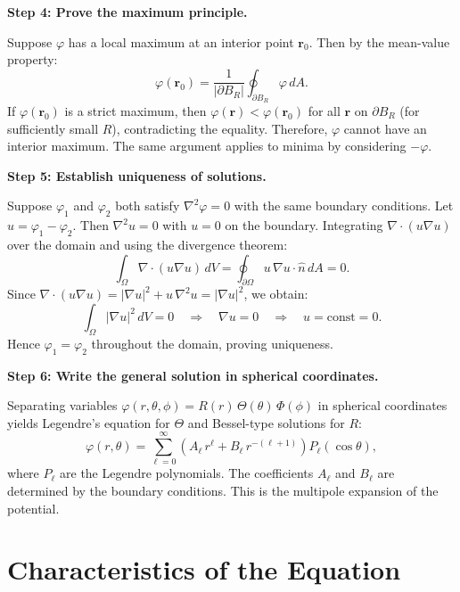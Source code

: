 \textbf{Step 4: Prove the maximum principle.}

Suppose $\varphi$ has a local maximum at an interior point $\mathbf{r}_0$. Then by the mean-value property:
\begin{equation}
\varphi(\mathbf{r}_0) = \frac{1}{|\partial B_R|}\oint_{\partial B_R}\varphi\,dA.
\end{equation}
If $\varphi(\mathbf{r}_0)$ is a strict maximum, then $\varphi(\mathbf{r}) < \varphi(\mathbf{r}_0)$ for all $\mathbf{r}$ on $\partial B_R$ (for sufficiently small $R$), contradicting the equality. Therefore, $\varphi$ cannot have an interior maximum. The same argument applies to minima by considering $-\varphi$.

\textbf{Step 5: Establish uniqueness of solutions.}

Suppose $\varphi_1$ and $\varphi_2$ both satisfy $\nabla^{2}\varphi = 0$ with the same boundary conditions. Let $u = \varphi_1 - \varphi_2$. Then $\nabla^{2}u = 0$ with $u = 0$ on the boundary. Integrating $\nabla\cdot(u\nabla u)$ over the domain and using the divergence theorem:
\begin{equation}
\int_{\Omega} \nabla\cdot(u\nabla u)\,dV = \oint_{\partial\Omega} u\,\nabla u\cdot\hat{n}\,dA = 0.
\end{equation}
Since $\nabla\cdot(u\nabla u) = |\nabla u|^{2} + u\,\nabla^{2}u = |\nabla u|^{2}$, we obtain:
\begin{equation}
\int_{\Omega} |\nabla u|^{2}\,dV = 0 \quad\Longrightarrow\quad \nabla u = 0 \quad\Longrightarrow\quad u = \text{const} = 0.
\end{equation}
Hence $\varphi_1 = \varphi_2$ throughout the domain, proving uniqueness.

\textbf{Step 6: Write the general solution in spherical coordinates.}

Separating variables $\varphi(r,\theta,\phi) = R(r)\,\Theta(\theta)\,\Phi(\phi)$ in spherical coordinates yields Legendre's equation for $\Theta$ and Bessel-type solutions for $R$:
\begin{equation}
\varphi(r,\theta) = \sum_{\ell=0}^{\infty}\left(A_{\ell}\,r^{\ell} + B_{\ell}\,r^{-(\ell+1)}\right)P_{\ell}(\cos\theta),
\end{equation}
where $P_{\ell}$ are the Legendre polynomials. The coefficients $A_{\ell}$ and $B_{\ell}$ are determined by the boundary conditions. This is the multipole expansion of the potential.

\section*{Characteristics of the Equation}

